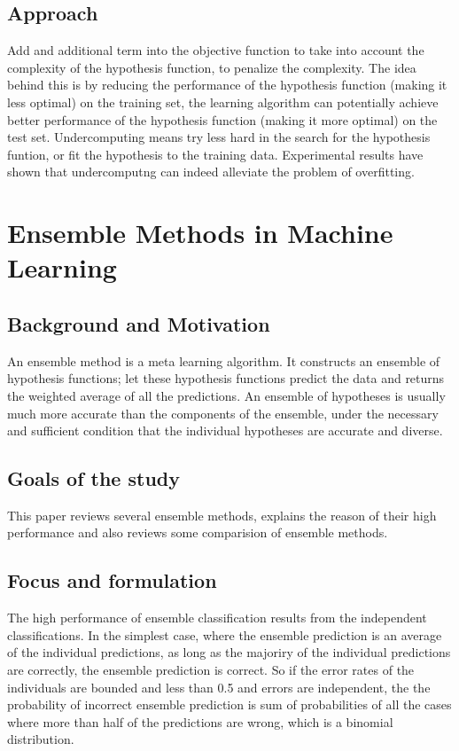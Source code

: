 \documentclass[12pt]{article}
\begin{document}
\subsection{Approach}
Add and additional term into the objective function to take into account the complexity of the hypothesis function, to penalize the complexity. The idea behind this is by reducing the performance of the hypothesis function (making it less optimal) on the training set, the learning algorithm can potentially achieve better performance of the hypothesis function (making it more optimal) on the test set. Undercomputing means try less hard in the search for the hypothesis funtion, or fit the hypothesis to the training data. Experimental results have shown that undercomputng can indeed alleviate the problem of overfitting.

\section{Ensemble Methods in Machine Learning}
\subsection{Background and Motivation}
An ensemble method is a meta learning algorithm\cite{dietterich2000ensemble}. It constructs an ensemble of hypothesis functions; let these hypothesis functions predict the data and returns the weighted average of all the predictions. An ensemble of hypotheses is usually much more accurate than the components of the ensemble, under the necessary and sufficient condition that the individual hypotheses are accurate and diverse.
\subsection{Goals of the study}
This paper reviews several ensemble methods, explains the reason of their high performance and also reviews some comparision of ensemble methods.
\subsection{Focus and formulation}
The high performance of ensemble classification results from the independent classifications. In the simplest case, where the ensemble prediction is an average of the individual predictions, as long as the majoriry of the individual predictions are correctly, the ensemble prediction is correct. So if the error rates of the individuals are bounded and less than 0.5 and errors are independent, the the probability of incorrect ensemble prediction is sum of probabilities of all the cases where more than half of the predictions are wrong, which is a binomial distribution.
\end{document}

